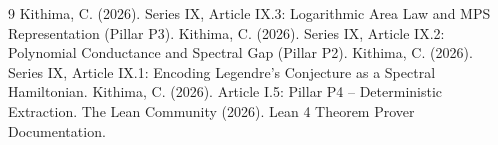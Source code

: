 \documentclass[11pt,a4paper]{article}
\begin{document}

\begin{thebibliography}{9}
  Kithima, C. (2026). Series IX, Article IX.3: Logarithmic Area Law and MPS Representation (Pillar P3).
  Kithima, C. (2026). Series IX, Article IX.2: Polynomial Conductance and Spectral Gap (Pillar P2).
  Kithima, C. (2026). Series IX, Article IX.1: Encoding Legendre's Conjecture as a Spectral Hamiltonian.
  Kithima, C. (2026). Article I.5: Pillar P4 – Deterministic Extraction.
  The Lean Community (2026). Lean 4 Theorem Prover Documentation.
\end{thebibliography}
\end{document}
